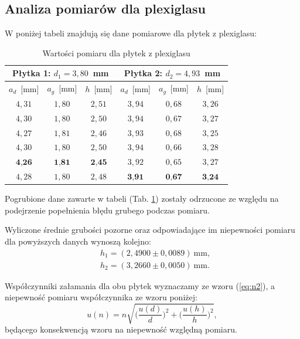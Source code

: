 \documentclass[12pt,a4paper]{article}
\numberwithin{equation}{section}
\begin{document}
\subsection{Analiza pomiarów dla plexiglasu}

W poniżej tabeli znajdują się dane pomiarowe dla płytek z plexiglasu:

\begin{table}[!ht]
	\caption{Wartości pomiaru dla płytek z plexiglasu}
	\centering
	\begin{tabular}{c|c|c||c|c|c}
		\hline \multicolumn{3}{c||}{Płytka 1: $d_1 = 3,80$~mm} & \multicolumn{3}{c}{Płytka 2: $d_2 = 4,93$~mm} \\ \hline 
		$a_d$~[mm] & $a_g$~[mm] & $h$~[mm] &  $a_d$~[mm] & $a_g$~[mm] & $h$~[mm] \\ \hline \hline
		$4,31$ & $1,80$ & $2,51$ & $3,94$ & $0,68$ & $3,26$\\
		$4,30$ & $1,80$ & $2,50$ & $3,94$ & $0,67$ & $3,27$\\
		$4,27$ & $1,81$ & $2,46$ & $3,93$ & $0,68$ & $3,25$\\
		$4,30$ & $1,80$ & $2,50$ & $3,94$ & $0,66$ & $3,28$\\
		$\textbf{4,26}$ & $\textbf{1,81}$ & $\textbf{2,45}$ & $3,92$ & $0,65$ & $3,27$\\
		$4,28$ & $1,80$ & $2,48$ & $\textbf{3,91}$ & $\textbf{0,67}$ & $\textbf{3,24}$\\ \hline
	\end{tabular}
	\label{tab:tab1}
\end{table}

Pogrubione dane zawarte w tabeli (Tab. \ref{tab:tab1}) zostały odrzucone ze względu na podejrzenie popełnienia błędu grubego podczas pomiaru.

Wyliczone średnie grubości pozorne oraz odpowiadające im niepewności pomiaru dla powyższych danych wynoszą kolejno:
\begin{equation}
	\begin{split}
		& h_1 = (2,4900 \pm 0,0089)~\textrm{mm}, \\
		& h_2 = (3,2660 \pm 0,0050)~\textrm{mm}.
	\end{split}
\end{equation}

Współczynniki załamania dla obu płytek wyznaczamy ze wzoru (\ref{eq:n2}), a niepewność pomiaru współczynnika ze wzoru poniżej:
\begin{equation}
	u(n) = n \sqrt{\Bigg(\frac{u(d)}{d}\Bigg)^2 + \Bigg(\frac{u(h)}{h}\Bigg)^2},
	\label{eq:un}
\end{equation}
będącego konsekwencją wzoru na niepewność względną pomiaru.
\end{document}
